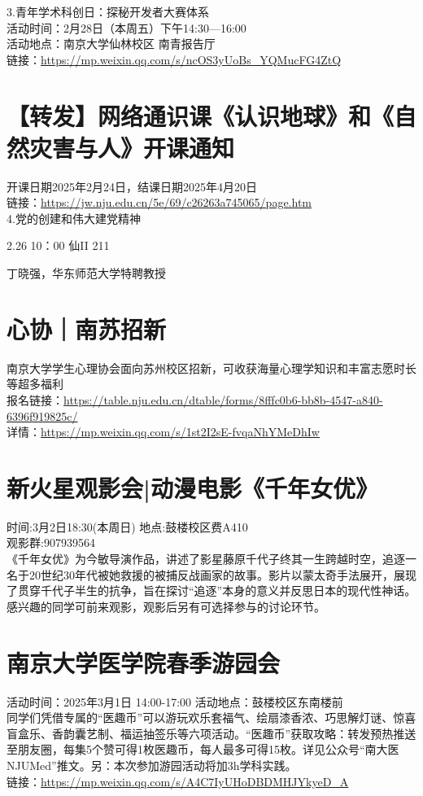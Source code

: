 \documentclass[letterpaper, 12pt]{article}
\begin{document}
\begin{multicols}{2}
3.青年学术科创日：探秘开发者大赛体系\\
活动时间：2月28日（本周五）下午14:30—16:00\\
活动地点：南京大学仙林校区 南青报告厅\\
链接：\url{https://mp.weixin.qq.com/s/ncOS3yUoBs_YQMucFG4ZtQ}\\
\section{【转发】网络通识课《认识地球》和《自然灾害与人》开课通知}
开课日期2025年2月24日，结课日期2025年4月20日\\
链接：\url{https://jw.nju.edu.cn/5e/69/c26263a745065/page.htm}\\

4.党的创建和伟大建党精神

2.26 10：00 仙II 211

丁晓强，华东师范大学特聘教授\\
\section{心协｜南苏招新}
南京大学学生心理协会面向苏州校区招新，可收获海量心理学知识和丰富志愿时长等超多福利\\
报名链接：\url{https://table.nju.edu.cn/dtable/forms/8fffc0b6-bb8b-4547-a840-6396f919825c/}\\
详情：\url{https://mp.weixin.qq.com/s/1st2I2sE-fvqaNhYMeDhIw}\\


\section{新火星观影会|动漫电影《千年女优》}
时间:3月2日18:30(本周日) 地点:鼓楼校区费A410\\
观影群:907939564\\
《千年女优》为今敏导演作品，讲述了影星藤原千代子终其一生跨越时空，追逐一名于20世纪30年代被她救援的被捕反战画家的故事。影片以蒙太奇手法展开，展现了贯穿千代子半生的抗争，旨在探讨“追逐”本身的意义并反思日本的现代性神话。感兴趣的同学可前来观影，观影后另有可选择参与的讨论环节。\\


\section{南京大学医学院春季游园会}
活动时间：2025年3月1日 14:00-17:00   活动地点：鼓楼校区东南楼前\\
同学们凭借专属的“医趣币”可以游玩欢乐套福气、绘扇漆香浓、巧思解灯谜、惊喜盲盒乐、香韵囊艺制、福运抽签乐等六项活动。“医趣币”获取攻略：转发预热推送至朋友圈，每集5个赞可得1枚医趣币，每人最多可得15枚。详见公众号“南大医 NJUMed”推文。另：本次参加游园活动将加3h学科实践。\\
链接：\url{https://mp.weixin.qq.com/s/A4C7IyUHoDBDMHJYkyeD_A}




\end{multicols}
\end{document}
